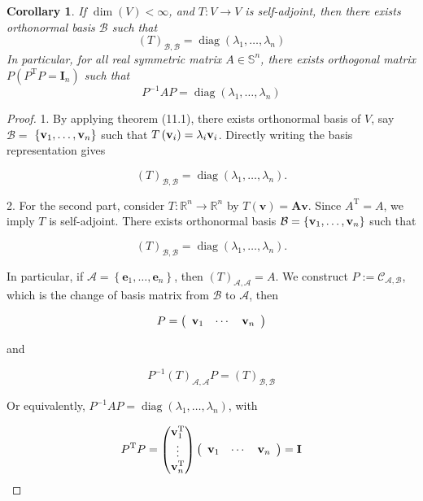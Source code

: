 \documentclass[11pt]{article}
\newtheorem{corollary}[theorem]{Corollary}
\begin{document}
\begin{corollary} If \(\dim \left( V\right)  < \infty\), and \(T : V \rightarrow  V\) is self-adjoint, then there exists orthonormal basis \(\mathcal{B}\) such that
\[
{\left( T\right) }_{\mathcal{B},\mathcal{B}} = \operatorname{diag}\left( {{\lambda }_1,\ldots ,{\lambda }_n}\right)
\]
In particular, for all real symmetric matrix \(A \in  {\mathbb{S}}^n\), there exists orthogonal matrix \(P\left( {{P}^{\mathrm{T}}P = {\mathbf{I}}_n}\right)\) such that
\[
{P}^{-1}{AP} = \operatorname{diag}\left( {{\lambda }_1,\ldots ,{\lambda }_n}\right)
\]
\end{corollary}
\begin{proof} 1. By applying theorem (11.1), there exists orthonormal basis of \(V\), say \(\mathcal{B} =\)  \(\left\{  {{\bf v}_1,\ldots ,{\bf v}_n}\right\}\) such that \(T\left( {\bf v}_{i}\right)  = {\lambda }_{i}{\bf v}_{i}\). Directly writing the basis representation gives

\[
{\left( T\right) }_{\mathcal{B},\mathcal{B}} = \operatorname{diag}\left( {{\lambda }_1,\ldots ,{\lambda }_n}\right) .
\]

2. For the second part, consider \(T : {\mathbb{R}}^n \rightarrow  {\mathbb{R}}^n\) by \(T\left( \mathbf{v}\right)  = \mathbf{{Av}}\). Since \({A}^{\mathrm{T}} = A\), we imply \(T\) is self-adjoint. There exists orthonormal basis \(\mathcal{B} = \left\{  {{\bf v}_1,\ldots ,{\bf v}_n}\right\}\) such that

\[
{\left( T\right) }_{\mathcal{B},\mathcal{B}} = \operatorname{diag}\left( {{\lambda }_1,\ldots ,{\lambda }_n}\right) .
\]

In particular, if \(\mathcal{A} = \left\{  {{\mathbf{e}}_1,\ldots ,{\mathbf{e}}_n}\right\}\), then \({\left( T\right) }_{\mathcal{A},\mathcal{A}} = A\). We construct \(P \mathrel{\text{ := }} {\mathcal{C}}_{\mathcal{A},\mathcal{B}}\), which is the change of basis matrix from \(\mathcal{B}\) to \(\mathcal{A}\), then

\[
P = \left( \begin{array}{lll} {\bf v}_1 & \cdots & {\bf v}_n \end{array}\right)
\]

and

\[
{P}^{-1}{\left( T\right) }_{\mathcal{A},\mathcal{A}}P = {\left( T\right) }_{\mathcal{B},\mathcal{B}}
\]

Or equivalently, \({P}^{-1}{AP} = \operatorname{diag}\left( {{\lambda }_1,\ldots ,{\lambda }_n}\right)\), with

\[
{P}^{\mathrm{T}}P = \left( \begin{matrix} {\bf v}_1^{\mathrm{T}} \\  \vdots \\  {\bf v}_n^{\mathrm{T}} \end{matrix}\right) \left( \begin{array}{lll} {\bf v}_1 & \cdots & {\bf v}_n \end{array}\right)  = \mathbf{I}
\]
\end{proof}
\end{document}
